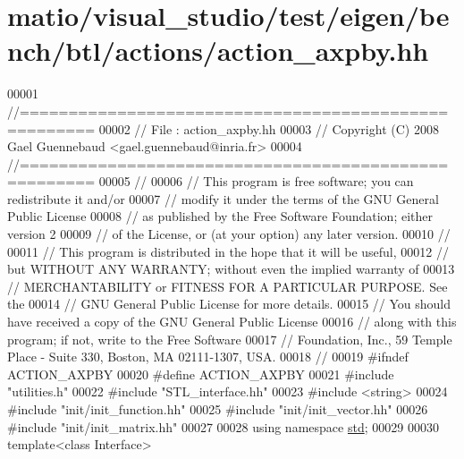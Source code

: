 \hypertarget{matio_2visual__studio_2test_2eigen_2bench_2btl_2actions_2action__axpby_8hh_source}{}\section{matio/visual\+\_\+studio/test/eigen/bench/btl/actions/action\+\_\+axpby.hh}
\label{matio_2visual__studio_2test_2eigen_2bench_2btl_2actions_2action__axpby_8hh_source}

\begin{DoxyCode}
00001 \textcolor{comment}{//=====================================================}
00002 \textcolor{comment}{// File   :  action\_axpby.hh}
00003 \textcolor{comment}{// Copyright (C) 2008 Gael Guennebaud <gael.guennebaud@inria.fr>}
00004 \textcolor{comment}{//=====================================================}
00005 \textcolor{comment}{//}
00006 \textcolor{comment}{// This program is free software; you can redistribute it and/or}
00007 \textcolor{comment}{// modify it under the terms of the GNU General Public License}
00008 \textcolor{comment}{// as published by the Free Software Foundation; either version 2}
00009 \textcolor{comment}{// of the License, or (at your option) any later version.}
00010 \textcolor{comment}{//}
00011 \textcolor{comment}{// This program is distributed in the hope that it will be useful,}
00012 \textcolor{comment}{// but WITHOUT ANY WARRANTY; without even the implied warranty of}
00013 \textcolor{comment}{// MERCHANTABILITY or FITNESS FOR A PARTICULAR PURPOSE.  See the}
00014 \textcolor{comment}{// GNU General Public License for more details.}
00015 \textcolor{comment}{// You should have received a copy of the GNU General Public License}
00016 \textcolor{comment}{// along with this program; if not, write to the Free Software}
00017 \textcolor{comment}{// Foundation, Inc., 59 Temple Place - Suite 330, Boston, MA  02111-1307, USA.}
00018 \textcolor{comment}{//}
00019 \textcolor{preprocessor}{#ifndef ACTION\_AXPBY}
00020 \textcolor{preprocessor}{#define ACTION\_AXPBY}
00021 \textcolor{preprocessor}{#include "utilities.h"}
00022 \textcolor{preprocessor}{#include "STL\_interface.hh"}
00023 \textcolor{preprocessor}{#include <string>}
00024 \textcolor{preprocessor}{#include "init/init\_function.hh"}
00025 \textcolor{preprocessor}{#include "init/init\_vector.hh"}
00026 \textcolor{preprocessor}{#include "init/init\_matrix.hh"}
00027 
00028 \textcolor{keyword}{using namespace }\hyperlink{namespacestd}{std};
00029 
00030 \textcolor{keyword}{template}<\textcolor{keyword}{class} Interface>

\end{DoxyCode}
